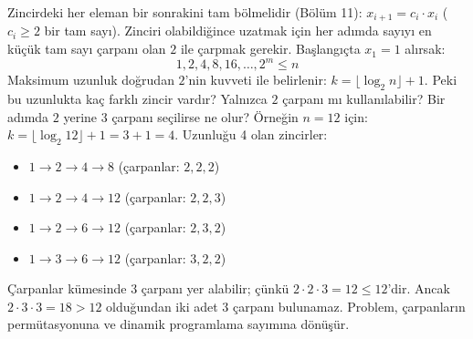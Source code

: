 Zincirdeki her eleman bir sonrakini tam bölmelidir (Bölüm 11): $x_{i+1} = c_i \cdot x_i$ ($c_i \ge 2$ bir tam sayı).
Zinciri olabildiğince uzatmak için her adımda sayıyı en küçük tam sayı çarpanı olan $2$ ile çarpmak gerekir.
Başlangıçta $x_1 = 1$ alırsak:
\[
1, 2, 4, 8, 16, \dots, 2^m \le n
\]
Maksimum uzunluk doğrudan $2$'nin kuvveti ile belirlenir: $k = \lfloor \log_2 n \rfloor + 1$.
Peki bu uzunlukta kaç farklı zincir vardır?
Yalnızca $2$ çarpanı mı kullanılabilir?
Bir adımda $2$ yerine $3$ çarpanı seçilirse ne olur?
Örneğin $n=12$ için:
$k = \lfloor \log_2 12 \rfloor + 1 = 3 + 1 = 4$.
Uzunluğu 4 olan zincirler:
\begin{itemize}
    \item $1 \to 2 \to 4 \to 8$ (çarpanlar: $2, 2, 2$)
    \item $1 \to 2 \to 4 \to 12$ (çarpanlar: $2, 2, 3$)
    \item $1 \to 2 \to 6 \to 12$ (çarpanlar: $2, 3, 2$)
    \item $1 \to 3 \to 6 \to 12$ (çarpanlar: $3, 2, 2$)
\end{itemize}
Çarpanlar kümesinde $3$ çarpanı yer alabilir; çünkü $2 \cdot 2 \cdot 3 = 12 \le 12$'dir. Ancak $2 \cdot 3 \cdot 3 = 18 > 12$ olduğundan iki adet $3$ çarpanı bulunamaz.
Problem, çarpanların permütasyonuna ve dinamik programlama sayımına dönüşür.

